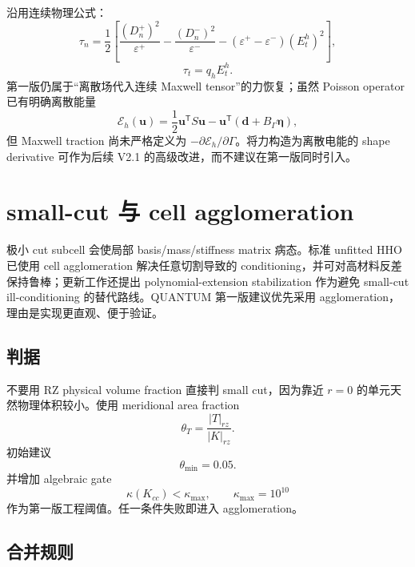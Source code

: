 \documentclass[UTF8,a4paper,11pt]{ctexart}
\newcommand{\eps}{\varepsilon}
\newcommand{\vct}[1]{\bm{#1}}
\newcommand{\T}{\mathsf{T}}
\begin{document}
沿用连续物理公式：
\begin{equation}
\boxed{
\tau_n
=\frac12\left[
\frac{(D_n^+)^2}{\eps^+}
-\frac{(D_n^-)^2}{\eps^-}
-(\eps^+-\eps^-)(E_t^h)^2
\right],
}
\label{eq:normal_traction}
\end{equation}
\begin{equation}
\boxed{\tau_t=q_hE_t^h.}
\label{eq:tangential_traction}
\end{equation}
第一版仍属于“离散场代入连续 Maxwell tensor”的力恢复；虽然 Poisson operator 已有明确离散能量
\begin{equation}
\mathcal E_h(\vct u)
=\frac12\vct u^{\T}S\vct u
-\vct u^{\T}(\vct d+B_\Gamma\vct\eta),
\label{eq:discrete_energy}
\end{equation}
但 Maxwell traction 尚未严格定义为 \(-\partial\mathcal E_h/\partial\Gamma\)。将力构造为离散电能的 shape derivative 可作为后续 V2.1 的高级改进，而不建议在第一版同时引入。

\section{small-cut 与 cell agglomeration}

极小 cut subcell 会使局部 basis/mass/stiffness matrix 病态。标准 unfitted HHO 已使用 cell agglomeration 解决任意切割导致的 conditioning，并可对高材料反差保持鲁棒\cite{BurmanCicuttinDelayErn2021}；更新工作还提出 polynomial-extension stabilization 作为避免 small-cut ill-conditioning 的替代路线\cite{BurmanErnMottier2026}。QUANTUM 第一版建议优先采用 agglomeration，理由是实现更直观、便于验证。

\subsection{判据}

不要用 RZ physical volume fraction 直接判 small cut，因为靠近 \(r=0\) 的单元天然物理体积较小。使用 meridional area fraction
\begin{equation}
\theta_T=\frac{|T|_{rz}}{|K|_{rz}}.
\label{eq:small_cut_fraction}
\end{equation}
初始建议
\[
\theta_{\min}=0.05.
\]
并增加 algebraic gate
\[
\kappa(K_{cc})<\kappa_{\max},
\qquad
\kappa_{\max}=10^{10}
\]
作为第一版工程阈值。任一条件失败即进入 agglomeration。

\subsection{合并规则}
\end{document}
